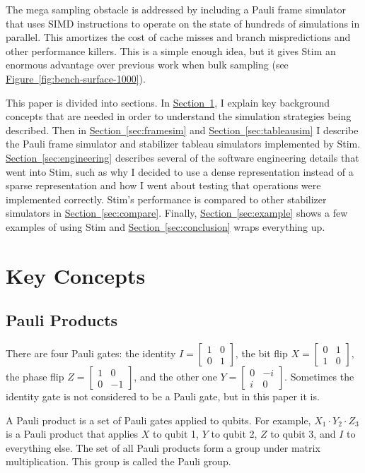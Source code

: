 \documentclass[onecolumn,unpublished]{quantumarticle}
\theoremstyle{definition}
\theoremstyle{definition}
\theoremstyle{definition}
\renewcommand{\sec}[1]{\hyperref[sec:#1]{Section~\ref*{sec:#1}}}
\newcommand{\fig}[1]{\hyperref[fig:#1]{Figure~\ref*{fig:#1}}}
\begin{document}
The mega sampling obstacle is addressed by including a Pauli frame simulator that uses SIMD instructions to operate on the state of hundreds of simulations in parallel.
This amortizes the cost of cache misses and branch mispredictions and other performance killers.
This is a simple enough idea, but it gives Stim an enormous advantage over previous work when bulk sampling (see \fig{bench-surface-1000}).

This paper is divided into sections.
In \sec{concepts}, I explain key background concepts that are needed in order to understand the simulation strategies being described.
Then in \sec{framesim} and \sec{tableausim} I describe the Pauli frame simulator and stabilizer tableau simulators implemented by Stim.
\sec{engineering} describes several of the software engineering details that went into Stim, such as why I decided to use a dense representation instead of a sparse representation and how I went about testing that operations were implemented correctly.
Stim's performance is compared to other stabilizer simulators in \sec{compare}.
Finally, \sec{example} shows a few examples of using Stim and \sec{conclusion} wraps everything up.

\section{Key Concepts}
\label{sec:concepts}

\subsection{Pauli Products}

There are four Pauli gates: the identity $I = \begin{bmatrix} 1&0\\0&1\end{bmatrix}$, the bit flip $X = \begin{bmatrix} 0&1\\1&0\end{bmatrix}$, the phase flip $Z = \begin{bmatrix} 1&0\\0&-1\end{bmatrix}$, and the other one $Y = \begin{bmatrix} 0&-i\\i&0\end{bmatrix}$.
Sometimes the identity gate is not considered to be a Pauli gate, but in this paper it is.

A Pauli product is a set of Pauli gates applied to qubits.
For example, $X_1 \cdot Y_2 \cdot Z_3$ is a Pauli product that applies $X$ to qubit 1, $Y$ to qubit 2, $Z$ to qubit 3, and $I$ to everything else.
The set of all Pauli products form a group under matrix multiplication.
This group is called the Pauli group.
\end{document}
